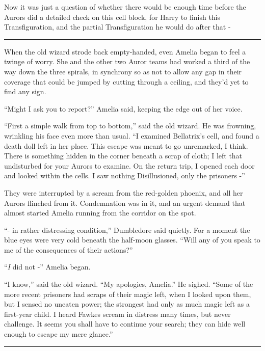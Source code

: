 Now it was just a question of whether there would be enough time before
the Aurors did a detailed check on this cell block, for Harry to finish
this Transfiguration, and the partial Transfiguration he would do after
that -

\begin{center}\rule{3in}{0.4pt}\end{center}

When the old wizard strode back empty-handed, even Amelia began to feel
a twinge of worry. She and the other two Auror teams had worked a third
of the way down the three spirals, in synchrony so as not to allow any
gap in their coverage that could be jumped by cutting through a ceiling,
and they'd yet to find any sign.

``Might I ask you to report?'' Amelia said, keeping the edge out of her
voice.

``First a simple walk from top to bottom,'' said the old wizard. He was
frowning, wrinkling his face even more than usual. ``I examined
Bellatrix's cell, and found a death doll left in her place. This escape
was meant to go unremarked, I think. There is something hidden in the
corner beneath a scrap of cloth; I left that undisturbed for your Aurors
to examine. On the return trip, I opened each door and looked within the
cells. I saw nothing Disillusioned, only the prisoners -''

They were interrupted by a scream from the red-golden phoenix, and all
her Aurors flinched from it. Condemnation was in it, and an urgent
demand that almost started Amelia running from the corridor on the spot.

``- in rather distressing condition,'' Dumbledore said quietly. For a
moment the blue eyes were very cold beneath the half-moon glasses.
``Will any of you speak to me of the consequences of their actions?''

``\emph{I} did not -'' Amelia began.

``I know,'' said the old wizard. ``My apologies, Amelia.'' He sighed.
``Some of the more recent prisoners had scraps of their magic left, when
I looked upon them, but I sensed no uneaten power; the strongest had
only as much magic left as a first-year child. I heard Fawkes scream in
distress many times, but never challenge. It seems you shall have to
continue your search; they can hide well enough to escape my mere
glance.''

\begin{center}\rule{3in}{0.4pt}\end{center}

